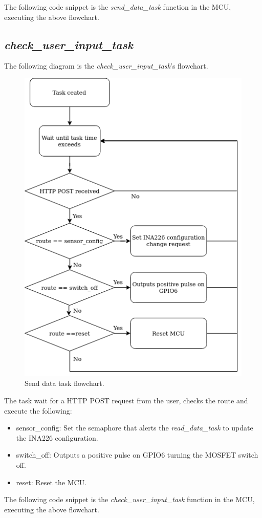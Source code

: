 \documentclass[../main.tex]{subfiles}
\begin{document}
    \pagebreak
    \justify
    The following code snippet is the \textit{send\_data\_task} function in the MCU, executing the above flowchart.
    

    \pagebreak
    \subsection{\textit{check\_user\_input\_task}}
    The following diagram is the \textit{check\_user\_input\_task}'s flowchart.

    \begin{figure}[!h]
        \centerline{\includegraphics[scale=0.55]{media/check_user_input_task_flowchart.drawio.png}}
        \caption{Send data task flowchart.}
        \label{fig:check_user_input_task_flowchart}
    \end{figure}
    
    \justify
    The task wait for a HTTP POST request from the user, checks the route and execute the following:

    \begin{itemize}
        \item sensor\_config: Set the semaphore that alerts the \textit{read\_data\_task} to update the INA226 configuration.
        \item switch\_off: Outputs a positive pulse on GPIO6 turning the MOSFET switch off.
        \item reset: Reset the MCU.
    \end{itemize}

    \pagebreak
    \justify
    The following code snippet is the \textit{check\_user\_input\_task} function in the MCU, executing the above flowchart.
    


    
\end{document}
